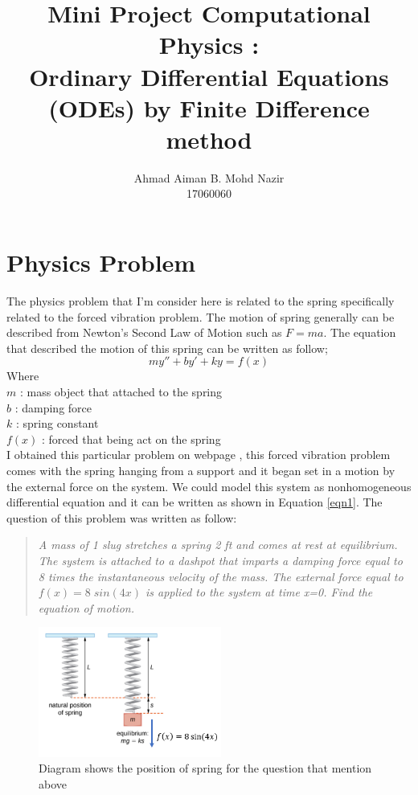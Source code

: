 \documentclass[a4paper,11.5 pt]{article}
\author{Ahmad Aiman B. Mohd Nazir \\17060060}
\date{}
\title{Mini Project Computational Physics :\\ \Large Ordinary Differential Equations (ODEs) by Finite Difference method}
\begin{document}
\maketitle

\section{Physics Problem}
The physics problem that I'm consider here is related to the spring specifically related to the forced vibration problem. The motion of spring generally can be described from Newton's Second Law of Motion such as $F = ma$. The equation that described the motion of this spring can be written as follow;
\begin{equation} \label{eqn1}
    my'' + by' + ky = f(x)
\end{equation}
Where \\
$m$ : mass object that attached to the spring\\
$b$ : damping force\\
$k$ : spring constant\\
$f(x)$ : forced that being act on the spring \\


I obtained this particular problem on webpage \cite{libretexts_2021}, this forced vibration problem comes with the spring hanging from a support and it began set in a motion by the external force on the system. We could model this system as nonhomogeneous differential equation and it can be written as shown in Equation \ref{eqn1}. The question of this problem was written as follow:
\begin{quote}\label{Q1}
\textit{A mass of 1 slug stretches a spring 2 ft and comes at rest at equilibrium. The system is attached to a dashpot that imparts a damping force equal to 8 times the instantaneous velocity of the mass. The external force equal to $f(x) = 8\; sin(4x)$ is applied to the system at time x=0. Find the equation of motion. }
\end{quote}
\begin{figure}[h]
    \centering
    \includegraphics[width=6cm,height=4 cm]{diagram/spring2.PNG}
    \caption{Diagram shows the position of spring for the question that mention above}
    \label{fig1}
\end{figure}
\newpage
\end{document}
